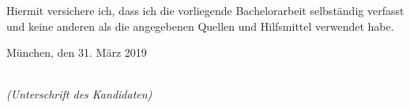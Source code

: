 %
%
%
%

\newpage

\thispagestyle{empty}

\begin{large}

\vspace*{2cm}

\noindent
Hiermit versichere ich, dass ich die vorliegende Bachelorarbeit
selbst\"andig verfasst und keine anderen als die angegebenen Quellen
und Hilfsmittel verwendet habe.

\vspace{2cm}

\noindent
M\"unchen, den 31. M\"arz 2019

\vspace{3cm}

\hspace*{7cm}%
\dotfill\\
\hspace*{8.5cm}%
\textit{(Unterschrift des Kandidaten)}

\end{large}
